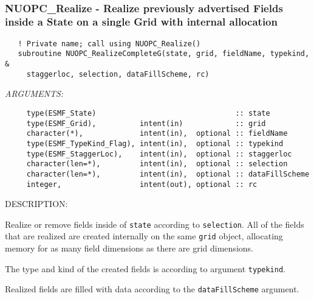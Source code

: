  
\mbox{}\hrulefill\ 
 
\subsubsection [NUOPC\_Realize] {NUOPC\_Realize - Realize previously advertised Fields inside a State on a single Grid with internal allocation}


\begin{verbatim}   ! Private name; call using NUOPC_Realize()
   subroutine NUOPC_RealizeCompleteG(state, grid, fieldName, typekind, &
     staggerloc, selection, dataFillScheme, rc)\end{verbatim}{\em ARGUMENTS:}
\begin{verbatim}     type(ESMF_State)                                :: state
     type(ESMF_Grid),          intent(in)            :: grid
     character(*),             intent(in),  optional :: fieldName
     type(ESMF_TypeKind_Flag), intent(in),  optional :: typekind
     type(ESMF_StaggerLoc),    intent(in),  optional :: staggerloc
     character(len=*),         intent(in),  optional :: selection
     character(len=*),         intent(in),  optional :: dataFillScheme    
     integer,                  intent(out), optional :: rc\end{verbatim}
{\sf DESCRIPTION:\\ }


     \label{NUOPC_RealizeCompleteG}
  
     Realize or remove fields inside of {\tt state} according to {\tt selection}.
     All of the fields that are realized are created internally on the same 
     {\tt grid} object, allocating memory for as many field dimensions as there 
     are grid dimensions.
  
     The type and kind of the created fields is according to argument 
     {\tt typekind}.
  
     Realized fields are filled with data according to the {\tt dataFillScheme}
     argument.
  
